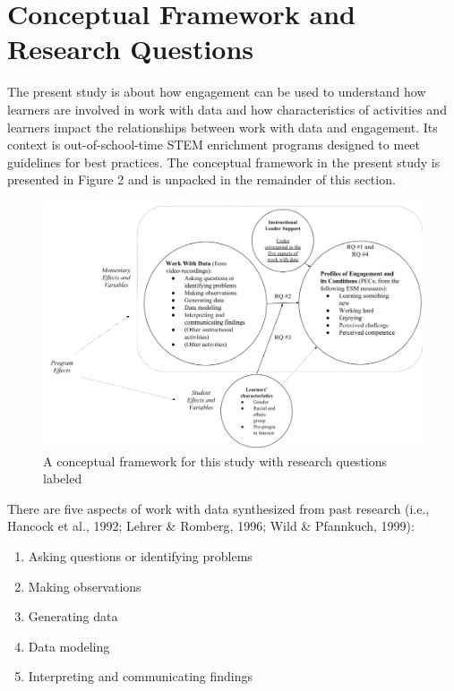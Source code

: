 \documentclass[]{msu-thesis}
\providecommand{\tightlist}{%
  \setlength{\itemsep}{0pt}\setlength{\parskip}{0pt}}
\theoremstyle{definition}
\theoremstyle{definition}
\theoremstyle{definition}
\theoremstyle{remark}
\begin{document}
\section{Conceptual Framework and Research
Questions}\label{conceptual-framework-and-research-questions}

The present study is about how engagement can be used to understand how
learners are involved in work with data and how characteristics of
activities and learners impact the relationships between work with data
and engagement. Its context is out-of-school-time STEM enrichment
programs designed to meet guidelines for best practices. The conceptual
framework in the present study is presented in Figure 2 and is unpacked
in the remainder of this section.

\begin{figure}

{\centering \includegraphics[width=0.8\linewidth]{images/figure2} 

}

\caption{A conceptual framework for this study with research questions labeled}\label{fig:unnamed-chunk-2}
\end{figure}

There are five aspects of work with data synthesized from past research
(i.e., Hancock et al., 1992; Lehrer \& Romberg, 1996; Wild \& Pfannkuch,
1999):

\begin{enumerate}
\def\labelenumi{\arabic{enumi}.}
\tightlist
\item
  Asking questions or identifying problems
\item
  Making observations
\item
  Generating data
\item
  Data modeling
\item
  Interpreting and communicating findings
\end{enumerate}
\end{document}
